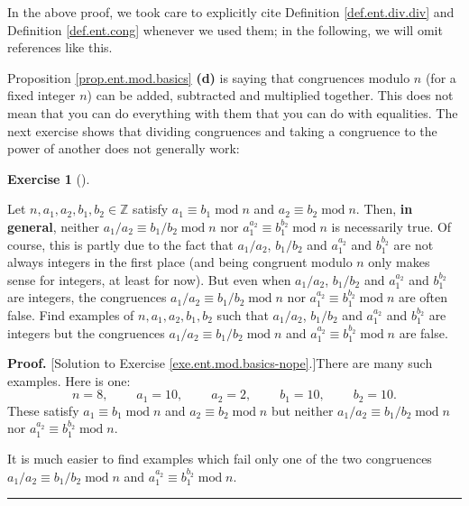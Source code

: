 \documentclass[numbers=enddot,12pt,final,onecolumn,notitlepage]{scrartcl}%
\newcounter{exer}
\numberwithin{exer}{subsection}
\theoremstyle{definition}
\newtheorem{exmp}[exer]{Exercise}
\newenvironment{exercise}[1][]
{\begin{exmp}[#1]\begin{leftbar}}
{\end{leftbar}\end{exmp}}
\newenvironment{fineprint}{\begin{small}}{\end{small}}
\newenvironment{proof}[1][Proof]{\noindent\textbf{#1.} }{\ \rule{0.5em}{0.5em}}
\begin{document}
In the above proof, we took care to explicitly cite Definition
\ref{def.ent.div.div} and Definition \ref{def.ent.cong} whenever we used them;
in the following, we will omit references like this.

Proposition \ref{prop.ent.mod.basics} \textbf{(d)} is saying that congruences
modulo $n$ (for a fixed integer $n$) can be added, subtracted and multiplied
together. This does not mean that you can do everything with them that you can
do with equalities. The next exercise shows that dividing congruences and
taking a congruence to the power of another does not generally work:

\begin{exercise}
\label{exe.ent.mod.basics-nope}Let $n,a_{1},a_{2},b_{1},b_{2}\in\mathbb{Z}$
satisfy $a_{1}\equiv b_{1}\operatorname{mod}n$ and $a_{2}\equiv b_{2}%
\operatorname{mod}n$. Then, \textbf{in general}, neither $a_{1}/a_{2}\equiv
b_{1}/b_{2}\operatorname{mod}n$ nor $a_{1}^{a_{2}}\equiv b_{1}^{b_{2}%
}\operatorname{mod}n$ is necessarily true. Of course, this is partly due to
the fact that $a_{1}/a_{2}$, $b_{1}/b_{2}$ and $a_{1}^{a_{2}}$ and
$b_{1}^{b_{2}}$ are not always integers in the first place (and being
congruent modulo $n$ only makes sense for integers, at least for now). But
even when $a_{1}/a_{2}$, $b_{1}/b_{2}$ and $a_{1}^{a_{2}}$ and $b_{1}^{b_{2}}$
are integers, the congruences $a_{1}/a_{2}\equiv b_{1}/b_{2}\operatorname{mod}%
n$ nor $a_{1}^{a_{2}}\equiv b_{1}^{b_{2}}\operatorname{mod}n$ are often false.
Find examples of $n,a_{1},a_{2},b_{1},b_{2}$ such that $a_{1}/a_{2}$,
$b_{1}/b_{2}$ and $a_{1}^{a_{2}}$ and $b_{1}^{b_{2}}$ are integers but the
congruences $a_{1}/a_{2}\equiv b_{1}/b_{2}\operatorname{mod}n$ and
$a_{1}^{a_{2}}\equiv b_{1}^{b_{2}}\operatorname{mod}n$ are false.
\end{exercise}

\begin{fineprint}
\begin{proof}
[Solution to Exercise \ref{exe.ent.mod.basics-nope}.]There are many such
examples. Here is one:%
\[
n=8,\ \ \ \ \ \ \ \ \ \ a_{1}=10,\ \ \ \ \ \ \ \ \ \ a_{2}%
=2,\ \ \ \ \ \ \ \ \ \ b_{1}=10,\ \ \ \ \ \ \ \ \ \ b_{2}=10.
\]
These satisfy $a_{1}\equiv b_{1}\operatorname{mod}n$ and $a_{2}\equiv
b_{2}\operatorname{mod}n$ but neither $a_{1}/a_{2}\equiv b_{1}/b_{2}%
\operatorname{mod}n$ nor $a_{1}^{a_{2}}\equiv b_{1}^{b_{2}}\operatorname{mod}%
n$.

It is much easier to find examples which fail only one of the two congruences
$a_{1}/a_{2}\equiv b_{1}/b_{2}\operatorname{mod}n$ and $a_{1}^{a_{2}}\equiv
b_{1}^{b_{2}}\operatorname{mod}n$.
\end{proof}
\end{fineprint}
\end{document}
